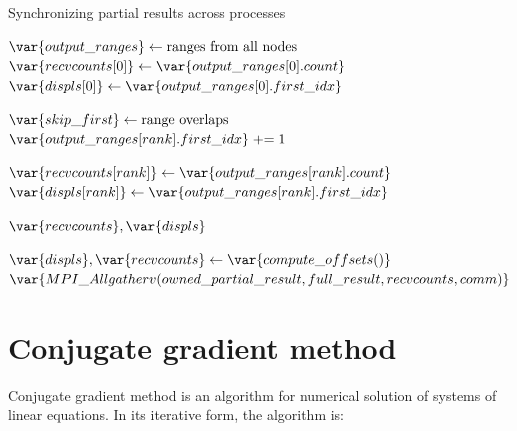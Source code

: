 \documentclass[thesis=M,english]{FITthesis}[2019/12/23]
\begin{document}
\newcommand{\pluseq}{\mathrel{+}=}
\begin{algorithm}
    \caption{Synchronizing partial results across processes}
    \begin{algorithmic}
        \State $\var{output\_ranges} \gets \text{ranges from all nodes}$
        \State $\var{recvcounts[0]} \gets \var{output\_ranges[0].count}$
        \State $\var{displs[0]} \gets \var{output\_ranges[0].first\_idx}$


        \State $\var{skip\_first} \gets \text{range overlaps}$
        \State $\var{output\_ranges[rank].first\_idx} \pluseq 1$
        \EndIf

        \State $\var{recvcounts[rank]} \gets \var{output\_ranges[rank].count}$
        \State $\var{displs[rank]} \gets \var{output\_ranges[rank].first\_idx}$

        \EndFor

        \Return $\var{recvcounts}, \var{displs}$

        \EndFunction

        \State $\var{displs}, \var{recvcounts} \gets \var{compute\_offsets()}$
        \State $\var{MPI\_Allgatherv(owned\_partial\_result, full\_result, recvcounts, comm)}$

        \EndFunction
    \end{algorithmic}
\end{algorithm}

\chapter{Conjugate gradient method}

Conjugate gradient method is an algorithm for numerical solution of systems of linear
equations. In its iterative form, the algorithm is:
\end{document}

